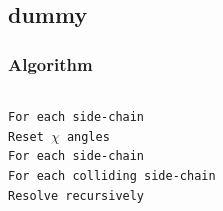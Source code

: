 \documentclass{beamer}
\begin{document}
\subsection{dummy}
\begin{frame}
	\frametitle{Algorithm}
	\begin{columns}[c]
	\column{5.5cm}
	
	
	\texttt{For each side-chain}\\
	\texttt{\;\;\;\;Reset $\chi$ angles}\\
	\texttt{For each side-chain}\\
	\texttt{\;\;\;\;For each colliding side-chain}\\
	\texttt{\;\;\;\;\;\;\;\;Resolve recursively}\\


	


\end{columns}
\end{frame}
\end{document}
